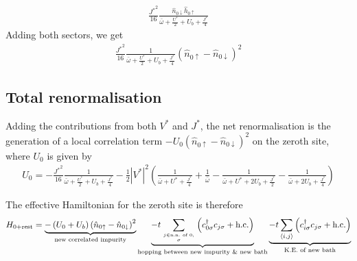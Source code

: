 \begin{equation}\begin{aligned}
	\frac{{J^*}^2}{16}\frac{\hat n_{ 0 \downarrow} \hat h_{0 \uparrow}}{\bar\omega + \frac{U^*}{2} + U_b + \frac{J^*}{4}}
\end{aligned}\end{equation}
Adding both sectors, we get
\begin{equation}\begin{aligned}
	\frac{{J^*}^2}{16}\frac{1}{\bar\omega + \frac{U^*}{2} + U_b + \frac{J^*}{4}} \left(\hat n_{ 0\uparrow} - \hat n_{0 \downarrow}\right)^2
\end{aligned}\end{equation}

\subsection{Total renormalisation}
Adding the contributions from both \(V^*\) and \(J^*\),  the net renormalisation is the generation of a local correlation term \(-U_0\left(\hat n_{ 0\uparrow} - \hat n_{0 \downarrow}\right)^2\) on the zeroth site, where \(U_0\) is given by
\begin{equation}\begin{aligned}
	U_0 = -\frac{{J^*}^2}{16}\frac{1}{\bar\omega + \frac{U^*}{2} + U_b + \frac{J^*}{4}} - \frac{1}{2}|V^*|^2\left(\frac{1}{\bar\omega + U^* + \frac{J^*}{4}} + \frac{1}{\bar\omega} - \frac{1}{\bar\omega + U^* + 2U_b + \frac{J^*}{2}} - \frac{1}{\bar\omega + 2U_b + \frac{J^*}{4}}\right) 
\end{aligned}\end{equation}

The effective Hamiltonian for the zeroth site is therefore
\begin{equation}\begin{aligned}
	H_\text{0+rest} = \underbrace{-\left(U_0 + U_b\right)\left(\hat n_{0\uparrow} - \hat n_{0\downarrow}\right)^2}_\text{new correlated impurity} \underbrace{- t\sum_{j\in \text{n.n. of 0},\atop{\sigma}}\left(c^\dagger_{0\sigma}c_{j\sigma} + \text{h.c.}\right)}_\text{hopping between new impurity \& new bath} \underbrace{-t \sum_{\left<i,j \right>}\left(c^\dagger_{i\sigma}c_{j\sigma} + \text{h.c.}\right)}_\text{K.E. of new bath}
\end{aligned}\end{equation}

